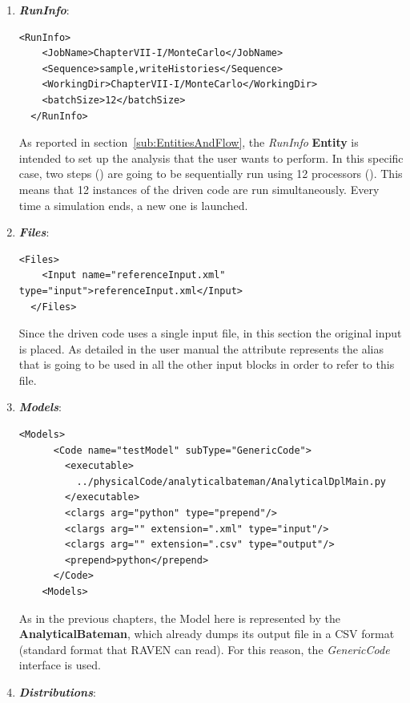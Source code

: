 \begin{enumerate}
   \item \textbf{\textit{RunInfo}}:
\begin{lstlisting}[style=XML,morekeywords={arg,extension,pauseAtEnd,overwrite}]
  <RunInfo>
    <JobName>ChapterVII-I/MonteCarlo</JobName>
    <Sequence>sample,writeHistories</Sequence>
    <WorkingDir>ChapterVII-I/MonteCarlo</WorkingDir>
    <batchSize>12</batchSize>
  </RunInfo>
\end{lstlisting}   
   As reported in section~\ref{sub:EntitiesAndFlow}, the \textit{RunInfo} \textbf{Entity} is intended to set up the analysis 
   that the user wants to perform. In this specific case, two steps () are going to be sequentially run 
   using 12 processors (). This means that
   12 instances of the driven code are run simultaneously. 
   Every time a simulation ends, a new one is launched.
   \item \textbf{\textit{Files}}:
\begin{lstlisting}[style=XML,morekeywords={arg,extension,pauseAtEnd,overwrite}]
  <Files>
    <Input name="referenceInput.xml" type="input">referenceInput.xml</Input>
  </Files>
\end{lstlisting}
   Since the driven code uses a single input file, in this section the original input is placed. As detailed in the user manual
   the attribute   represents the alias that is going to be used in all the other input blocks in order to refer to this file.
   \item \textbf{\textit{Models}}:
\begin{lstlisting}[style=XML,morekeywords={arg,extension,pauseAtEnd,overwrite}]
   <Models>
      <Code name="testModel" subType="GenericCode">
        <executable>
          ../physicalCode/analyticalbateman/AnalyticalDplMain.py
        </executable>
        <clargs arg="python" type="prepend"/>
        <clargs arg="" extension=".xml" type="input"/>
        <clargs arg="" extension=".csv" type="output"/>
        <prepend>python</prepend>
      </Code>
    <Models>
\end{lstlisting}
 As in the previous chapters, the Model here is represented by the 
 \textbf{AnalyticalBateman}, which already dumps its output file in a 
 CSV format (standard format that RAVEN can read). For this reason,
 the \textit{GenericCode} interface is used.
   \item \textbf{\textit{Distributions}}:
\begin{lstlisting}[style=XML,morekeywords={arg,extension,pauseAtEnd,overwrite}]

\end{lstlisting}
\end{enumerate}
